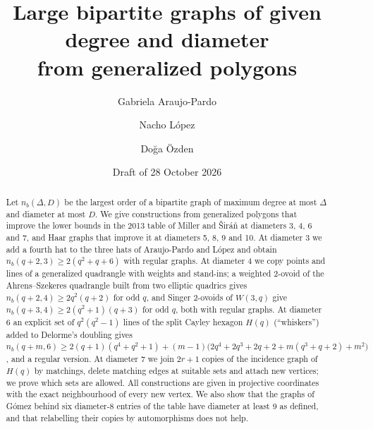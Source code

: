 \documentclass[11pt]{amsart}
\title[Large bipartite graphs of given degree and diameter]{Large bipartite graphs of given degree and diameter\\
from generalized polygons}
\author{Gabriela Araujo-Pardo}
\author{Nacho L\'opez}
\author{Do\u{g}a \"Ozden}
\date{Draft of 28 October 2026}
\theoremstyle{definition}
\theoremstyle{remark}
\numberwithin{equation}{section}
\newcommand{\nb}{n_b}
\begin{document}
\begin{abstract}
Let $\nb(\Delta,D)$ be the largest order of a bipartite graph of maximum degree at most $\Delta$ and diameter at most
$D$. We give constructions from generalized polygons that improve the lower bounds in the 2013 table of Miller and
\v{S}ir\'a\v{n} at diameters 3, 4, 6 and 7, and Haar graphs that improve it at diameters 5, 8, 9 and 10. At diameter 3
we add a fourth hat to the three hats of Araujo-Pardo and L\'opez and obtain $\nb(q+2,3)\ge 2(q^2+q+6)$ with regular
graphs. At diameter 4 we copy points and lines of a generalized quadrangle with weights and stand-ins; a weighted
2-ovoid of the Ahrens--Szekeres quadrangle built from two elliptic quadrics gives $\nb(q+2,4)\ge 2q^2(q+2)$ for odd
$q$, and Singer 2-ovoids of $W(3,q)$ give $\nb(q+3,4)\ge 2(q^2+1)(q+3)$ for odd $q$, both with regular graphs. At diameter 6 an
explicit set of $q^2(q^2-1)$ lines of the split Cayley hexagon $H(q)$ (``whiskers'') added to Delorme's doubling gives
$\nb(q+m,6)\ge 2(q+1)(q^4+q^2+1)+(m-1)\bigl(2q^4+2q^3+2q+2+m(q^3+q+2)+m^2\bigr)$, and a regular version. At diameter 7
we join $2r+1$ copies of the incidence graph of $H(q)$ by matchings, delete matching edges at suitable sets and attach
new vertices; we prove which sets are allowed. All constructions are given in projective coordinates with the exact
neighbourhood of every new vertex. We also show that the graphs of G\'omez behind six diameter-8 entries of the table
have diameter at least 9 as defined, and that relabelling their copies by automorphisms does not help.
\end{abstract}

\maketitle

\makeatletter{}\makeatother



\end{document}
